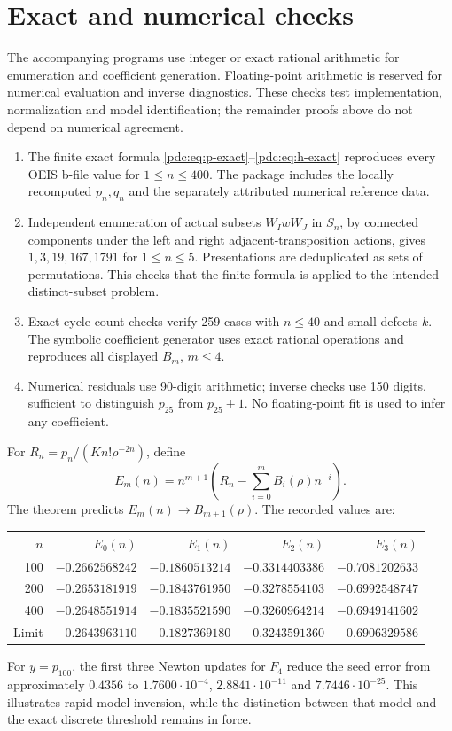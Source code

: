\documentclass[11pt,letterpaper]{article}
\theoremstyle{remark}\newtheorem{remark}[theorem]{Remark}
\begin{document}
\section{Exact and numerical checks}
\label{pdc:sec:checks}
The accompanying programs use integer or exact rational arithmetic for enumeration and coefficient generation. Floating-point arithmetic is reserved for numerical evaluation and inverse diagnostics. These checks test implementation, normalization and model identification; the remainder proofs above do not depend on numerical agreement.

\begin{enumerate}[leftmargin=*,itemsep=3pt]
\item The finite exact formula \eqref{pdc:eq:p-exact}--\eqref{pdc:eq:h-exact} reproduces every OEIS b-file value for $1\leq n\leq400$. The package includes the locally recomputed $p_n,q_n$ and the separately attributed numerical reference data.
\item Independent enumeration of actual subsets $W_IwW_J$ in $S_n$, by connected components under the left and right adjacent-transposition actions, gives $1,3,19,167,1791$ for $1\leq n\leq5$. Presentations are deduplicated as sets of permutations. This checks that the finite formula is applied to the intended distinct-subset problem.
\item Exact cycle-count checks verify 259 cases with $n\leq40$ and small defects $k$. The symbolic coefficient generator uses exact rational operations and reproduces all displayed $B_m$, $m\leq4$.
\item Numerical residuals use 90-digit arithmetic; inverse checks use 150 digits, sufficient to distinguish $p_{25}$ from $p_{25}+1$. No floating-point fit is used to infer any coefficient.
\end{enumerate}

For $R_n=p_n/(Kn!\rho^{-2n})$, define
\[
 E_m(n)=n^{m+1}\left(R_n-\sum_{i=0}^mB_i(\rho)n^{-i}\right).
\]
The theorem predicts $E_m(n)\to B_{m+1}(\rho)$. The recorded values are:
\begin{center}
\begin{tabular}{r r r r r}
\toprule
$n$ & $E_0(n)$ & $E_1(n)$ & $E_2(n)$ & $E_3(n)$\\
\midrule
100 & $-0.2662568242$ & $-0.1860513214$ & $-0.3314403386$ & $-0.7081202633$\\
200 & $-0.2653181919$ & $-0.1843761950$ & $-0.3278554103$ & $-0.6992548747$\\
400 & $-0.2648551914$ & $-0.1835521590$ & $-0.3260964214$ & $-0.6949141602$\\
\midrule
Limit & $-0.2643963110$ & $-0.1827369180$ & $-0.3243591360$ & $-0.6906329586$\\
\bottomrule
\end{tabular}
\end{center}
For $y=p_{100}$, the first three Newton updates for $F_4$ reduce the seed error from approximately $0.4356$ to $1.7600\cdot10^{-4}$, $2.8841\cdot10^{-11}$ and $7.7446\cdot10^{-25}$. This illustrates rapid model inversion, while the distinction between that model and the exact discrete threshold remains in force.
\end{document}
